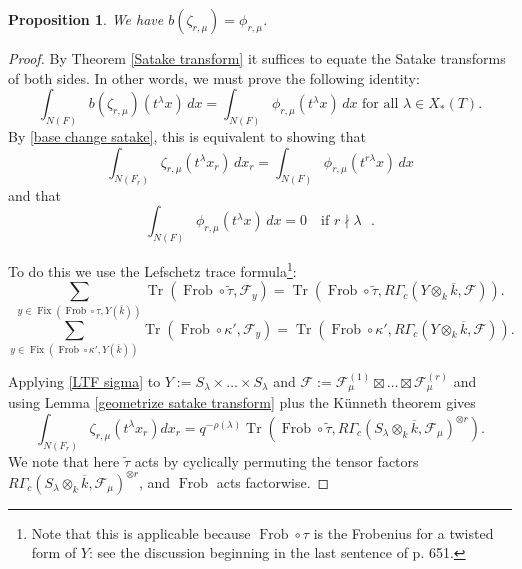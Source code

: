 \documentclass[reqno]{amsart}
\numberwithin{equation}{section}
\newcommand{\wt}[1]{\widetilde{#1}}
\newcommand{\ol}[1]{\overline{#1}}
\newcommand{\Cal}[1]{\mathcal{#1}}
\DeclareMathOperator{\Frob}{Frob}
\DeclareMathOperator{\Tr}{Tr}
\DeclareMathOperator{\Fix}{Fix}
\newtheorem{prop}[thm]{Proposition}
\theoremstyle{remark}
\newtheorem{remark}[thm]{Remark}
\numberwithin{equation}{section}
\begin{document}
\begin{prop}\label{prop1}
We have $b(\zeta_{r,\mu}) =  \phi_{r, \mu}$. 
\end{prop}

\begin{proof}
By Theorem \ref{Satake transform} it suffices to equate the Satake transforms of both sides. In other words, we must prove the following identity: 
\[
\int_{N(F)} b(\zeta_{r,\mu})(t^{\lambda} x) \, dx = \int_{N(F)} \phi_{r,\mu}(t^{\lambda} x) \, dx \text{ for all } \lambda \in X_*(T).
\]
By \eqref{base change satake}, this is equivalent to showing that 
\begin{equation}\label{eq: bc required eq 1}
\int_{N(F_{r})} \zeta_{r,\mu}(t^{\lambda} x_r) \, dx_r = \int_{N(F)} \phi_{r,\mu}(t^{r \lambda} x) \, dx
\end{equation}
and that 
\begin{equation}\label{eq: bc required eq 2}
\int_{N(F)} \phi_{r,\mu}(t^{\lambda} x) \, dx = 0 \quad \text{
 if $r \nmid \lambda$ }.
\end{equation}

To do this we use the Lefschetz trace formula\footnote{Note that this is applicable because $\Frob \circ \tau$ is the Frobenius for a twisted form of $Y$: see the discussion beginning in the last sentence of \cite{Ngo99} p. 651.}:
\begin{equation}\label{LTF sigma}
\sum_{y \in \Fix(\Frob \circ \tau, Y(\ol{k}))} \Tr(\Frob \circ \wt{\tau}, \Cal{F}_y) = \Tr(\Frob \circ \wt{\tau}, R  \Gamma_c(Y \otimes_k \ol{k}, \Cal{F})).
\end{equation}
\begin{equation}\label{LTF kappa}
\sum_{y \in \Fix(\Frob \circ \kappa', Y(\ol{k}))} \Tr(\Frob \circ \kappa', \Cal{F}_y) = \Tr(\Frob \circ \kappa', R  \Gamma_c(Y \otimes_k \ol{k}, \Cal{F})).
\end{equation}



Applying \eqref{LTF sigma} to $Y:=S_{\lambda} \times \ldots \times S_{\lambda}$ and $ \Cal{F} := \Cal{F}_{\mu}^{(1)} \boxtimes \ldots \boxtimes \Cal{F}_{\mu}^{(r)} $ and using Lemma \ref{geometrize satake transform} plus the K\"{u}nneth theorem gives
\[
\int_{N(F_{r})} \zeta_{r,\mu}(t^{\lambda} x_r) dx_r  = q^{-\rho(\lambda)}\Tr(\Frob \circ \wt{\tau}, R\Gamma_c(S_{\lambda} \otimes_k \ol{k}, \Cal{F}_{\mu})^{\otimes  r}).
\]
We note that here $\wt{\tau}$ acts by cyclically permuting the tensor factors $R\Gamma_c(S_{\lambda} \otimes_k \ol{k}, \Cal{F}_{\mu})^{\otimes  r}$, and $\Frob$ acts factorwise. 


\end{proof}
\end{document}

